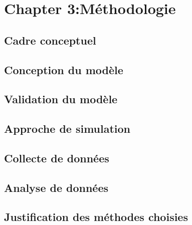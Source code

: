 \chapter{Chapter 3:Méthodologie}

\section{Cadre conceptuel}
\section{Conception du modèle}
\section{Validation du modèle}
\section{Approche de simulation}
\section{Collecte de données}
\section{Analyse de données}
\section{Justification des méthodes choisies}

